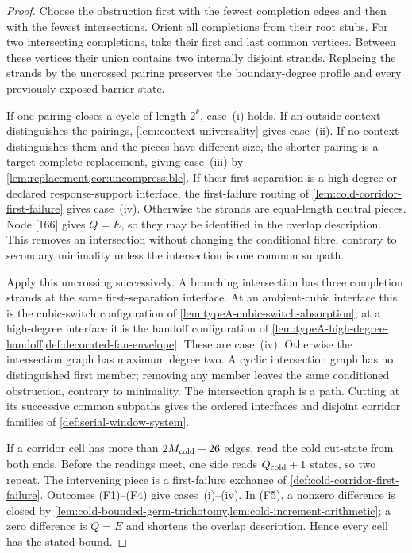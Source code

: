 \documentclass[11pt]{article}
\begin{document}
\begin{proof}
Choose the obstruction first with the fewest completion edges and then with
the fewest intersections.  Orient all completions from their root stubs.  For
two intersecting completions, take their first and last common vertices.
Between these vertices their union contains two internally disjoint strands.
Replacing the strands by the uncrossed pairing preserves the boundary-degree
profile and every previously exposed barrier state.

If one pairing closes a cycle of length \(2^k\), case~\textup{(i)} holds.  If
an outside context distinguishes the pairings,
\cref{lem:context-universality} gives case~\textup{(ii)}.  If no context
distinguishes them and the pieces have different size, the shorter pairing is
a target-complete replacement, giving case~\textup{(iii)} by
\cref{lem:replacement,cor:uncompressible}.  If their first separation is a
high-degree or declared response-support interface, the first-failure routing of
\cref{lem:cold-corridor-first-failure} gives case~\textup{(iv)}.  Otherwise
the strands are equal-length neutral pieces.  Node [166] gives \(Q=E\), so
they may be identified in the overlap description.  This removes an
intersection without changing the conditional fibre, contrary to secondary
minimality unless the intersection is one common subpath.

Apply this uncrossing successively.  A branching intersection has three
completion strands at the same first-separation interface.  At an
ambient-cubic interface this is the cubic-switch configuration of
\cref{lem:typeA-cubic-switch-absorption}; at a high-degree interface it is the
handoff configuration of
\cref{lem:typeA-high-degree-handoff,def:decorated-fan-envelope}.  These are
case~\textup{(iv)}.  Otherwise the intersection graph has maximum degree two.
A cyclic intersection graph has no distinguished first member; removing any
member leaves the same conditioned obstruction, contrary to minimality.  The
intersection graph is a path.  Cutting at its successive common subpaths gives
the ordered interfaces and disjoint corridor families of
\cref{def:serial-window-system}.

If a corridor cell has more than \(2M_{\rm cold}+26\) edges, read the cold
cut-state from both ends.  Before the readings meet, one side reads
\(Q_{\rm cold}+1\) states, so two repeat.  The intervening piece is a
first-failure exchange of \cref{def:cold-corridor-first-failure}.  Outcomes
(F1)--(F4) give cases~\textup{(i)}--\textup{(iv)}.  In (F5), a nonzero
difference is closed by
\cref{lem:cold-bounded-germ-trichotomy,lem:cold-increment-arithmetic}; a zero
difference is \(Q=E\) and shortens the overlap description.  Hence every cell
has the stated bound.


\end{proof}
\end{document}
